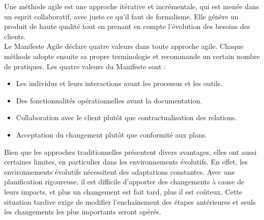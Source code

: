 
Une méthode agile est une approche itérative et incrémentale, qui est menée dans un esprit collaboratif, avec juste ce qu’il faut de formalisme. Elle génère un produit de haute qualité tout en prenant en compte l’évolution des besoins des clients\cite{agile1}.\\

Le Manifeste Agile déclare quatre valeurs dans toute approche agile. Chaque méthode adopte ensuite sa propre terminologie et recommande un certain nombre de pratiques. Les quatre valeurs du Manifeste sont\cite{agile1, agile4} :
\begin{itemize}
    \item Les individus et leurs interactions avant les processus et les outils. 
    \item Des fonctionnalités opérationnelles avant la documentation.
    \item Collaboration avec le client plutôt que contractualisation des relations. 
    \item Acceptation du changement plutôt que conformité aux plans.
\end{itemize}

Bien que les approches traditionnelles présentent divers avantages, elles ont aussi certaines limites, en particulier dans les environnements évolutifs. En effet, les environnements évolutifs nécessitent des adaptations constantes. Avec une planification rigoureuse, il est difficile d’apporter des changements à cause de leurs impacts, et plus un changement est fait tard, plus il est coûteux. Cette situation tardive exige de modifier l'enchaînement des étapes antérieures et seuls les changements les plus importants seront opérés.\\


